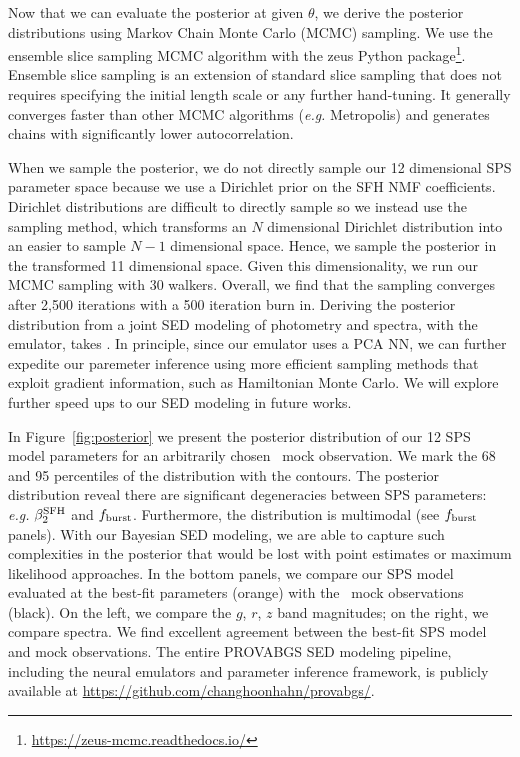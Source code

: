 Now that we can evaluate the posterior at given $\theta$, we derive the
posterior distributions using Markov Chain Monte Carlo (MCMC) sampling. 
We use the \cite{karamanis2020} ensemble slice sampling MCMC algorithm with the
{\sc zeus} Python
package\footnote{\href{https://zeus-mcmc.readthedocs.io/}{https://zeus-mcmc.readthedocs.io/}}. 
Ensemble slice sampling is an extension of standard slice sampling that does
not requires specifying the initial length scale or any further hand-tuning.
It generally converges faster than other MCMC algorithms (\emph{e.g.}
Metropolis) and generates chains with significantly lower autocorrelation.

When we sample the posterior, we do not directly sample our 12 dimensional
SPS parameter space because we use a Dirichlet prior on the SFH NMF
coefficients. 
Dirichlet distributions are difficult to directly sample so we instead use the
\cite{betancourt2012} sampling method, which transforms an $N$ dimensional
Dirichlet distribution into an easier to sample $N-1$ dimensional space.
Hence, we sample the posterior in the transformed 11 dimensional space. 
Given this dimensionality, we run our MCMC sampling with 30 walkers.
Overall, we find that the sampling converges after 2,500 iterations with a 500
iteration burn in. 
Deriving the posterior distribution from a joint SED modeling of photometry and
spectra, with the emulator, takes . 
In principle, since our emulator uses a PCA NN, we can further expedite our
paremeter inference using more efficient sampling methods that exploit gradient
information, such as Hamiltonian Monte Carlo.  
We will explore further speed ups to our SED modeling in future works. 

In Figure~\ref{fig:posterior} we present the posterior distribution of our 12
SPS model parameters for an arbitrarily chosen \lgal~mock observation. 
We mark the 68 and 95 percentiles of the distribution with the contours. 
The posterior distribution reveal there are significant degeneracies between
SPS parameters: \emph{e.g.} $\beta_2^{\rm SFH}$ and $f_{\rm burst}$. 
Furthermore, the distribution is multimodal (see $f_{\rm burst}$ panels). 
With our Bayesian SED modeling, we are able to capture such complexities in the
posterior that would be lost with point estimates or maximum likelihood
approaches.
In the bottom panels, we compare our SPS model evaluated at the best-fit
parameters (orange) with the \lgal~mock observations (black). 
On the left, we compare the $g$, $r$, $z$ band magnitudes; on the right, we
compare spectra. 
We find excellent agreement between the best-fit SPS model and mock
observations.
The entire PROVABGS SED modeling pipeline, including the neural emulators and
parameter inference framework, is publicly available at
\href{https://github.com/changhoonhahn/provabgs/}{https://github.com/changhoonhahn/provabgs/}. 

